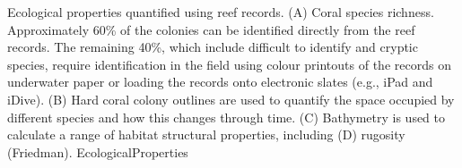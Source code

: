 \label{fig:EcologicalProperties}Ecological properties quantified using reef records. (A) Coral species richness. Approximately 60\% of the colonies can be identified directly from the reef records. The remaining 40\%, which include difficult to identify and cryptic species, require identification in the field using colour printouts of the records on underwater paper or loading the records onto electronic slates (e.g., iPad and iDive). (B) Hard coral colony outlines are used to quantify the space occupied by different species and how this changes through time. (C) Bathymetry is used to calculate a range of habitat structural properties, including (D) rugosity (Friedman).  EcologicalProperties
